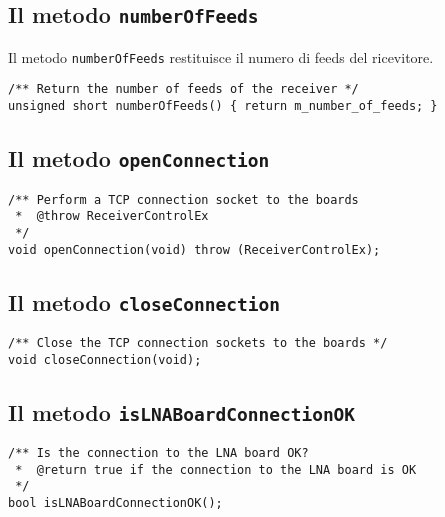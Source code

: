 \subsection{Il metodo \texttt{numberOfFeeds}}
Il metodo \texttt{numberOfFeeds} restituisce il numero di feeds del ricevitore.
\lstset{language=C++}
\begin{lstlisting}[caption={Dichiarazione del metodo \texttt{numberOfFeeds}},
label=lst:number_of_feeds,mathescape]
/** Return the number of feeds of the receiver */
unsigned short numberOfFeeds() { return m_number_of_feeds; }
\end{lstlisting}
\lstset{numbers=none}


\subsection{Il metodo \texttt{openConnection}}
\lstset{language=C++}
\begin{lstlisting}[caption={Dichiarazione del metodo \texttt{openConnection}},
label=lst:openConnection,mathescape]
/** Perform a TCP connection socket to the boards
 *  @throw ReceiverControlEx
 */
void openConnection(void) throw (ReceiverControlEx);
\end{lstlisting}
\lstset{numbers=none}


\subsection{Il metodo \texttt{closeConnection}}
\lstset{language=C++}
\begin{lstlisting}[caption={Dichiarazione del metodo \texttt{closeConnection}},
label=lst:closeConnection,mathescape]
/** Close the TCP connection sockets to the boards */
void closeConnection(void);
\end{lstlisting}
\lstset{numbers=none}


\subsection{Il metodo \texttt{isLNABoardConnectionOK}}
\lstset{language=C++}
\begin{lstlisting}[caption={Dichiarazione del metodo \texttt{isLNABoardConnectionOK}},
label=lst:isLNABoardConnectionOK,mathescape]
/** Is the connection to the LNA board OK?
 *  @return true if the connection to the LNA board is OK
 */
bool isLNABoardConnectionOK();
\end{lstlisting}
\lstset{numbers=none}


